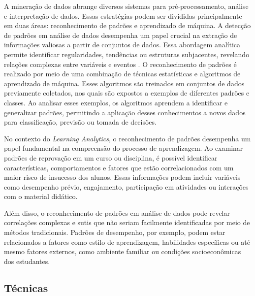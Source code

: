 A mineração de dados abrange diversos sistemas para pré-processamento, análise e interpretação de dados. Essas estratégias podem ser divididas principalmente em duas áreas: reconhecimento de padrões e aprendizado de máquina. %
A detecção de padrões em análise de dados desempenha um papel crucial na extração de informações valiosas a partir de conjuntos de dados. Essa abordagem analítica permite identificar regularidades, tendências ou estruturas subjacentes, revelando relações complexas entre variáveis e eventos \cite{Veluri2022}. O reconhecimento de padrões é realizado por meio de uma combinação de técnicas estatísticas e algoritmos de aprendizado de máquina. Esses algoritmos são treinados em conjuntos de dados previamente coletados, nos quais são expostos a exemplos de diferentes padrões e classes. Ao analisar esses exemplos, os algoritmos aprendem a identificar e generalizar padrões, permitindo a aplicação desses conhecimentos a novos dados para classificação, previsão ou tomada de decisões.

No contexto do \textit{Learning Analytics}, o reconhecimento de padrões desempenha um papel fundamental na compreensão do processo de aprendizagem. Ao examinar padrões de reprovação em um curso ou disciplina, é possível identificar características, comportamentos e fatores que estão correlacionados com um maior risco de insucesso dos alunos. Essas informações podem incluir variáveis como desempenho prévio, engajamento, participação em atividades ou interações com o material didático.

Além disso, o reconhecimento de padrões em análise de dados pode revelar correlações complexas e sutis que não seriam facilmente identificadas por meio de métodos tradicionais. Padrões de desempenho, por exemplo, podem estar relacionados a fatores como estilo de aprendizagem, habilidades específicas ou até mesmo fatores externos, como ambiente familiar ou condições socioeconômicas dos estudantes.

\subsection{Técnicas}
\label{subsec:tecnicas}

